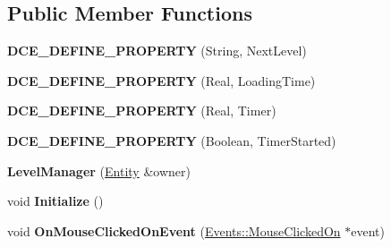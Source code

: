 \subsection*{Public Member Functions}
\begin{DoxyCompactItemize}
\item 
\hypertarget{classDCEngine_1_1Components_1_1LevelManager_adffd7d445d4fa9a324b54474f53d523f}{{\bfseries D\-C\-E\-\_\-\-D\-E\-F\-I\-N\-E\-\_\-\-P\-R\-O\-P\-E\-R\-T\-Y} (String, Next\-Level)}\label{classDCEngine_1_1Components_1_1LevelManager_adffd7d445d4fa9a324b54474f53d523f}

\item 
\hypertarget{classDCEngine_1_1Components_1_1LevelManager_ae44d377f3a1effc860946ad59e558b17}{{\bfseries D\-C\-E\-\_\-\-D\-E\-F\-I\-N\-E\-\_\-\-P\-R\-O\-P\-E\-R\-T\-Y} (Real, Loading\-Time)}\label{classDCEngine_1_1Components_1_1LevelManager_ae44d377f3a1effc860946ad59e558b17}

\item 
\hypertarget{classDCEngine_1_1Components_1_1LevelManager_a988a7c13b337b94a329982b7329ed75e}{{\bfseries D\-C\-E\-\_\-\-D\-E\-F\-I\-N\-E\-\_\-\-P\-R\-O\-P\-E\-R\-T\-Y} (Real, Timer)}\label{classDCEngine_1_1Components_1_1LevelManager_a988a7c13b337b94a329982b7329ed75e}

\item 
\hypertarget{classDCEngine_1_1Components_1_1LevelManager_aa3bda89569d6b8cede487a6911d89a15}{{\bfseries D\-C\-E\-\_\-\-D\-E\-F\-I\-N\-E\-\_\-\-P\-R\-O\-P\-E\-R\-T\-Y} (Boolean, Timer\-Started)}\label{classDCEngine_1_1Components_1_1LevelManager_aa3bda89569d6b8cede487a6911d89a15}

\item 
\hypertarget{classDCEngine_1_1Components_1_1LevelManager_a1b4235ec8fb047f4026fa2587b5e591d}{{\bfseries Level\-Manager} (\hyperlink{classDCEngine_1_1Entity}{Entity} \&owner)}\label{classDCEngine_1_1Components_1_1LevelManager_a1b4235ec8fb047f4026fa2587b5e591d}

\item 
\hypertarget{classDCEngine_1_1Components_1_1LevelManager_a89b81b1c67d445a7f9c12a8e87a33526}{void {\bfseries Initialize} ()}\label{classDCEngine_1_1Components_1_1LevelManager_a89b81b1c67d445a7f9c12a8e87a33526}

\item 
\hypertarget{classDCEngine_1_1Components_1_1LevelManager_a4dfb71846c269bde8c35a2fa2b89b5d6}{void {\bfseries On\-Mouse\-Clicked\-On\-Event} (\hyperlink{classDCEngine_1_1Events_1_1MouseClickedOn}{Events\-::\-Mouse\-Clicked\-On} $\ast$event)}\label{classDCEngine_1_1Components_1_1LevelManager_a4dfb71846c269bde8c35a2fa2b89b5d6}


\end{DoxyCompactItemize}
